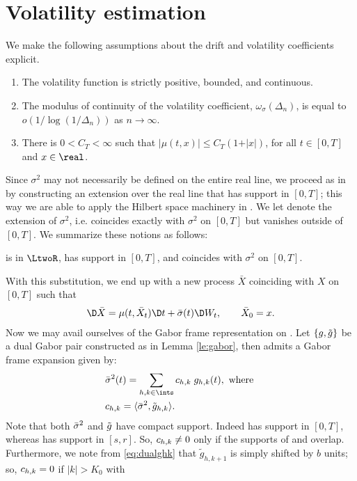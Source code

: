\section{Volatility estimation } \label{sec:estimator}
We make the following assumptions about the drift and volatility coefficients explicit.
\begin{ass}\label{as:vol}\mbox{} 
  \begin{enumerate}
    \item The volatility function is strictly positive, bounded, and  continuous. 
    \item The modulus of continuity  of the volatility coefficient,   $\omega_\sigma(\Delta_n)$, is equal to  $ o(1/\log(1/\Delta_n))$ as $n \to \infty$.  
    \item There is $0< C_T <\infty $ such that $\vert \mu(t , x) \vert \le C_T (1 + \vert x \vert)$, for all $t \in [0,T]$ and $x \in \real$.
  \end{enumerate}
\end{ass}
\noindent Since $\sigma^2$  may not necessarily be defined on the entire real line, we proceed as in \cite{GenonCatalot1992} by  constructing an extension over the real line that has support in $[0,T]$; this way we are able to apply the Hilbert space machinery in \LtwoR. We let \bsv denote the extension of $\sigma^2$, i.e.  \bsv coincides exactly with $\sigma^2$ on $[0,T]$ but vanishes outside of $[0,T]$. We summarize these notions as follows:
\begin{ass} \label{as:barvol}
  \bsv is in  $\LtwoR$,   has support in   $[0, T]$, and coincides with $\sigma^2$ on $[0,T]$.
\end{ass}
\noindent  With this substitution, we end up with a new process $\bar{X}$  coinciding with $X$ on $[0,T]$ such that 
\begin{align}
  \D\bar{X} = \mu(t, \bar{X}_t) \D t + \bar{\sigma}(t) \D W_t, \qquad \bar{X}_0 = x.\notag
  \label{}
\end{align}
Now we may avail ourselves of the Gabor frame representation on \LtwoR. Let $\{g, \tilde{g}\}$ be a dual Gabor pair constructed as in Lemma \eqref{le:gabor}, then   \bsv admits a Gabor frame expansion given by:  
\begin{align}
  &\bsv(t)  = \sum_{h,k \in \ints} \chk \;g_{h,k}(t), \text{ where } 
\\
&\chk = \langle \bsv, \tilde{g}_{h,k} \rangle.
\end{align}
Note that both $\bar{\sigma}^2$ and $\tilde{g}$ have compact support. Indeed \bsv has support in $[0,T]$, whereas  \tg has support in $[s,r]$. So, ${c}_{h,k} \ne 0$ only if  the supports of \bsv and \tghk overlap.  Furthermore, we note from \eqref{eq:dualghk} that $\tilde{g}_{h,k+1}$ is simply \tghk shifted by $b$ units; so, ${c}_{h,k} = 0$ if $|k| > K_0$ with 
